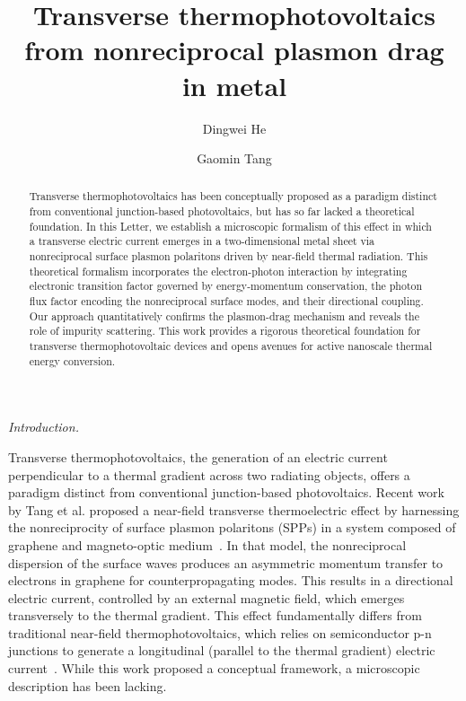 \documentclass[aps,prl,twocolumn,longbibliography]{revtex4-2}
\begin{document}
\title{Transverse thermophotovoltaics from nonreciprocal plasmon drag in metal}

\author{Dingwei He}

\author{Gaomin Tang}

\begin{abstract}
Transverse thermophotovoltaics has been conceptually proposed as a paradigm distinct
from conventional junction-based photovoltaics, but has so far lacked a theoretical
foundation. In this Letter, we establish a microscopic formalism of this effect in which a
transverse electric current emerges in a two-dimensional metal sheet via nonreciprocal
surface plasmon polaritons driven by near-field thermal radiation. This theoretical
formalism incorporates the electron-photon interaction by integrating electronic
transition factor governed by energy-momentum conservation, the photon flux factor
encoding the nonreciprocal surface modes, and their directional coupling.  Our approach
quantitatively confirms the plasmon-drag mechanism and reveals the role of impurity
scattering. This work provides a rigorous theoretical foundation for transverse
thermophotovoltaic devices and opens avenues for active nanoscale thermal energy
conversion.
\end{abstract}

\maketitle

{\it Introduction.}




Transverse thermophotovoltaics, the generation of an electric current perpendicular to a
thermal gradient across two radiating objects, offers a paradigm distinct from
conventional junction-based photovoltaics.
Recent work by Tang et al. proposed a near-field transverse thermoelectric effect by
harnessing the nonreciprocity of surface plasmon polaritons (SPPs) in a system composed of
graphene and magneto-optic medium~\cite{GT21}. In that model, the nonreciprocal dispersion
of the surface waves produces an asymmetric momentum transfer to electrons in graphene for
counterpropagating modes. This results in a directional electric current, controlled by an
external magnetic field, which emerges transversely to the thermal gradient.
This effect fundamentally differs from traditional near-field thermophotovoltaics, which
relies on semiconductor p-n junctions to generate a longitudinal (parallel to the thermal
gradient) electric current~\cite{TPV06, TPV-review18, TPV-review21-1, TPV-review21-2,
TPV-review23}. While this work proposed a conceptual framework, a microscopic description
has been lacking.
\end{document}
